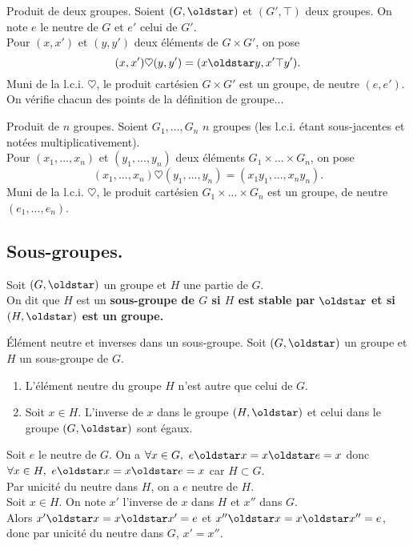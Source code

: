 \documentclass[11pt]{article}
\begin{document}
\begin{prop}{Produit de deux groupes.}{}
    Soient $(G,\s)$ et $(G',\top)$ deux groupes. On note $e$ le neutre de $G$ et $e'$ celui de $G'$.\\
    Pour $(x,x')$ et $(y,y')$ deux éléments de $G\times G'$, on pose
    \begin{equation*}
        (x,x')\heartsuit(y,y')=(x\s y, x' \top y').
    \end{equation*}
    Muni de la l.c.i. $\heartsuit$, le produit cartésien $G\times G'$ est un groupe, de neutre $(e,e')$.
    \tcblower
    On vérifie chacun des points de la définition de groupe...
\end{prop}

\pagebreak

\begin{prop}{Produit de $n$ groupes.}{}
    Soient $G_1,...,G_n$ $n$ groupes (les l.c.i. étant sous-jacentes et notées multiplicativement).\\
    Pour $(x_1,...,x_n)$ et $(y_1,...,y_n)$ deux éléments $G_1\times ... \times G_n$, on pose
    \begin{equation*}
        (x_1,...,x_n)\heartsuit(y_1,...,y_n)=(x_1y_1,...,x_ny_n).
    \end{equation*}
    Muni de la l.c.i. $\heartsuit$, le produit cartésien $G_1\times ... \times G_n$ est un groupe, de neutre $(e_1,...,e_n)$.
\end{prop}

\subsection{Sous-groupes.}

\begin{defi}{}{}
    Soit $(G,\s)$ un groupe et $H$ une partie de $G$.\\
    On dit que $H$ est un \bf{sous-groupe} de $G$ si $H$ est stable par $\s$ et si $(H,\s)$ est un groupe.
\end{defi}

\begin{prop}{Élément neutre et inverses dans un sous-groupe.}{}
    Soit $(G,\s)$ un groupe et $H$ un sous-groupe de $G$.
    \begin{enumerate}
        \item L'élément neutre du groupe $H$ n'est autre que celui de $G$.
        \item Soit $x\in H$. L'inverse de $x$ dans le groupe $(H,\s)$ et celui dans le groupe $(G,\s)$ sont égaux.
    \end{enumerate}
    \tcblower
     Soit $e$ le neutre de $G$. On a $\forall x \in G, ~ e\s x = x\s e = x$ donc $\forall x \in H, ~ e\s x = x\s e = x$ car $H\subset G$.\\
    Par unicité du neutre dans $H$, on a $e$ neutre de $H$.\\
     Soit $x\in H$. On note $x'$ l'inverse de $x$ dans $H$ et $x''$ dans $G$.\\
    Alors $x'\s x = x \s x' = e$ et $x''\s x = x\s x'' = e$, donc par unicité du neutre dans $G$, $x'=x''$. 
\end{prop}
\end{document}
